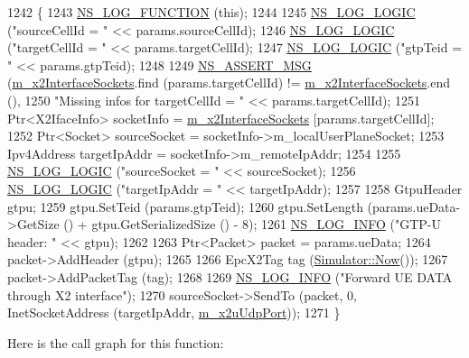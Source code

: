 \begin{DoxyCode}
1242 \{
1243   \hyperlink{log-macros-disabled_8h_a90b90d5bad1f39cb1b64923ea94c0761}{NS\_LOG\_FUNCTION} (\textcolor{keyword}{this});
1244 
1245   \hyperlink{group__logging_ga88acd260151caf2db9c0fc84997f45ce}{NS\_LOG\_LOGIC} (\textcolor{stringliteral}{"sourceCellId = "} << params.sourceCellId);
1246   \hyperlink{group__logging_ga88acd260151caf2db9c0fc84997f45ce}{NS\_LOG\_LOGIC} (\textcolor{stringliteral}{"targetCellId = "} << params.targetCellId);
1247   \hyperlink{group__logging_ga88acd260151caf2db9c0fc84997f45ce}{NS\_LOG\_LOGIC} (\textcolor{stringliteral}{"gtpTeid = "} << params.gtpTeid);
1248 
1249   \hyperlink{assert_8h_aff5ece9066c74e681e74999856f08539}{NS\_ASSERT\_MSG} (\hyperlink{classns3_1_1EpcX2_a0665276228b9b99a52ef6d5e9bdb306d}{m\_x2InterfaceSockets}.find (params.targetCellId) != 
      \hyperlink{classns3_1_1EpcX2_a0665276228b9b99a52ef6d5e9bdb306d}{m\_x2InterfaceSockets}.end (),
1250                  \textcolor{stringliteral}{"Missing infos for targetCellId = "} << params.targetCellId);
1251   Ptr<X2IfaceInfo> socketInfo = \hyperlink{classns3_1_1EpcX2_a0665276228b9b99a52ef6d5e9bdb306d}{m\_x2InterfaceSockets} [params.targetCellId];
1252   Ptr<Socket> sourceSocket = socketInfo->m\_localUserPlaneSocket;
1253   Ipv4Address targetIpAddr = socketInfo->m\_remoteIpAddr;
1254 
1255   \hyperlink{group__logging_ga88acd260151caf2db9c0fc84997f45ce}{NS\_LOG\_LOGIC} (\textcolor{stringliteral}{"sourceSocket = "} << sourceSocket);
1256   \hyperlink{group__logging_ga88acd260151caf2db9c0fc84997f45ce}{NS\_LOG\_LOGIC} (\textcolor{stringliteral}{"targetIpAddr = "} << targetIpAddr);
1257 
1258   GtpuHeader gtpu;
1259   gtpu.SetTeid (params.gtpTeid);
1260   gtpu.SetLength (params.ueData->GetSize () + gtpu.GetSerializedSize () - 8); 
1261   \hyperlink{group__logging_gafbd73ee2cf9f26b319f49086d8e860fb}{NS\_LOG\_INFO} (\textcolor{stringliteral}{"GTP-U header: "} << gtpu);
1262 
1263   Ptr<Packet> packet = params.ueData;
1264   packet->AddHeader (gtpu);
1265 
1266   EpcX2Tag tag (\hyperlink{classns3_1_1Simulator_ac3178fa975b419f7875e7105be122800}{Simulator::Now}());
1267   packet->AddPacketTag (tag);
1268 
1269   \hyperlink{group__logging_gafbd73ee2cf9f26b319f49086d8e860fb}{NS\_LOG\_INFO} (\textcolor{stringliteral}{"Forward UE DATA through X2 interface"});
1270   sourceSocket->SendTo (packet, 0, InetSocketAddress (targetIpAddr, \hyperlink{classns3_1_1EpcX2_aa0e3b62bf699a12b65309cb25f232974}{m\_x2uUdpPort}));
1271 \}
\end{DoxyCode}


Here is the call graph for this function\+:


